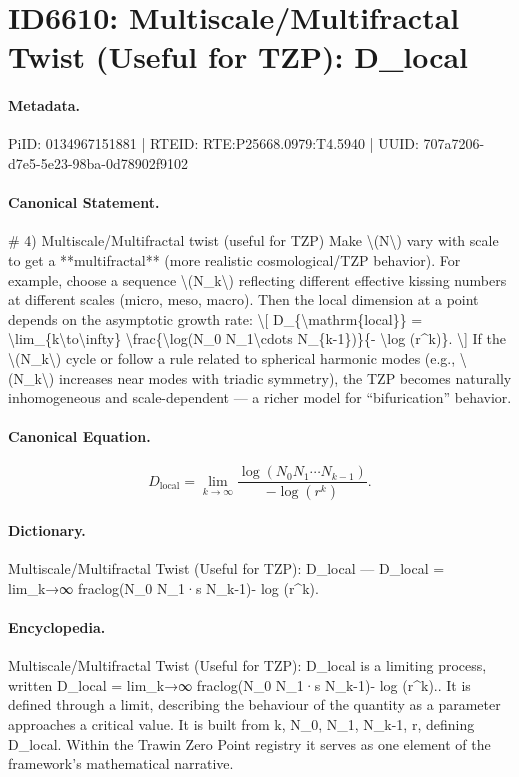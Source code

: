\section*{ID6610: Multiscale/Multifractal Twist (Useful for TZP): D\_local}
\paragraph{Metadata.}
PiID: 0134967151881 | RTEID: RTE:P25668.0979:T4.5940 | UUID: 707a7206-d7e5-5e23-98ba-0d78902f9102

\paragraph{Canonical Statement.}
\# 4) Multiscale/Multifractal twist (useful for TZP) Make \textbackslash{}(N\textbackslash{}) vary with scale to get a **multifractal** (more realistic cosmological/TZP behavior). For example, choose a sequence \textbackslash{}(N\_k\textbackslash{}) reflecting different effective kissing numbers at different scales (micro, meso, macro). Then the local dimension at a point depends on the asymptotic growth rate: \textbackslash{}[ D\_\{\textbackslash{}mathrm\{local\}\} = \textbackslash{}lim\_\{k\textbackslash{}to\textbackslash{}infty\} \textbackslash{}frac\{\textbackslash{}log(N\_0 N\_1\textbackslash{}cdots N\_\{k-1\})\}\{- \textbackslash{}log (r\textasciicircum{}k)\}. \textbackslash{}] If the \textbackslash{}(N\_k\textbackslash{}) cycle or follow a rule related to spherical harmonic modes (e.g., \textbackslash{}(N\_k\textbackslash{}) increases near modes with triadic symmetry), the TZP becomes naturally inhomogeneous and scale-dependent — a richer model for “bifurication” behavior.

\paragraph{Canonical Equation.}
\[
D_{\mathrm{local}} = \lim_{k\to\infty} \frac{\log(N_0 N_1\cdots N_{k-1})}{- \log (r^k)}.
\]

\paragraph{Dictionary.}
Multiscale/Multifractal Twist (Useful for TZP): D\_local — D\_local = lim\_k→∞ fraclog(N\_0 N\_1·s N\_k-1)- log (r\textasciicircum{}k).

\paragraph{Encyclopedia.}
Multiscale/Multifractal Twist (Useful for TZP): D\_local is a limiting process, written D\_local = lim\_k→∞ fraclog(N\_0 N\_1·s N\_k-1)- log (r\textasciicircum{}k).. It is defined through a limit, describing the behaviour of the quantity as a parameter approaches a critical value. It is built from k, N\_0, N\_1, N\_k-1, r, defining D\_local. Within the Trawin Zero Point registry it serves as one element of the framework's mathematical narrative.
